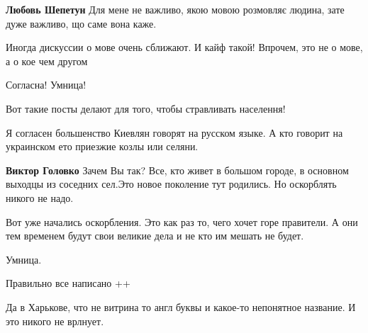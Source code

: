 \begin{itemize}
\begin{itemize}
\textbf{Любовь Шепетун} Для мене не важливо, якою мовою розмовляє людина, зате дуже важливо, що саме вона каже.
\end{itemize}


Иногда дискуссии о мове очень сближают. И кайф такой! Впрочем, это не о мове, а о кое чем другом


Согласна! Умница!


Вот такие посты делают для того, чтобы стравливать населення!


Я согласен большенство Киевлян говорят на русском языке. А кто говорит на украинском ето приезжие козлы или селяни.

\begin{itemize}

\textbf{Виктор Головко} Зачем Вы так? Все, кто живет в большом городе, в основном выходцы из соседних сел.Это новое поколение тут родились. Но оскорблять никого не надо.

Вот уже начались оскорбления. Это как раз то, чего хочет горе правители. А они тем временем будут свои великие дела и не кто им мешать не будет.
\end{itemize}


Умница.


Правильно все написано ++


Да в Харькове, что не витрина то англ буквы и какое-то непонятное название. И это никого не врлнует.


\end{itemize}
